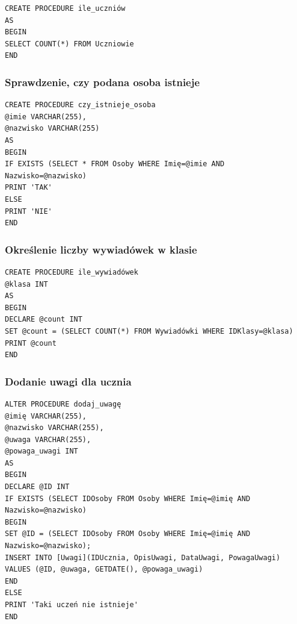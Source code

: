 \documentclass[60pt]{article}
\begin{document}
\begin{verbatim}
CREATE PROCEDURE ile_uczniów
AS
BEGIN
SELECT COUNT(*) FROM Uczniowie
END
\end{verbatim}

\subsubsection{Sprawdzenie, czy podana osoba istnieje}

\begin{verbatim}
CREATE PROCEDURE czy_istnieje_osoba
@imie VARCHAR(255),
@nazwisko VARCHAR(255)
AS
BEGIN
IF EXISTS (SELECT * FROM Osoby WHERE Imię=@imie AND Nazwisko=@nazwisko)
PRINT 'TAK'
ELSE
PRINT 'NIE'
END
\end{verbatim}

\subsubsection{Określenie liczby wywiadówek w klasie}

\begin{verbatim}
CREATE PROCEDURE ile_wywiadówek
@klasa INT
AS
BEGIN
DECLARE @count INT
SET @count = (SELECT COUNT(*) FROM Wywiadówki WHERE IDKlasy=@klasa)
PRINT @count
END
\end{verbatim}

\subsubsection{Dodanie uwagi dla ucznia}

\begin{verbatim}
ALTER PROCEDURE dodaj_uwagę
@imię VARCHAR(255),
@nazwisko VARCHAR(255),
@uwaga VARCHAR(255),
@powaga_uwagi INT
AS
BEGIN
DECLARE @ID INT
IF EXISTS (SELECT IDOsoby FROM Osoby WHERE Imię=@imię AND Nazwisko=@nazwisko)
BEGIN
SET @ID = (SELECT IDOsoby FROM Osoby WHERE Imię=@imię AND Nazwisko=@nazwisko);
INSERT INTO [Uwagi](IDUcznia, OpisUwagi, DataUwagi, PowagaUwagi) 
VALUES (@ID, @uwaga, GETDATE(), @powaga_uwagi)
END
ELSE
PRINT 'Taki uczeń nie istnieje'
END
\end{verbatim}
\end{document}
